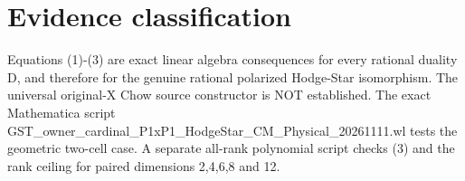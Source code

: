 \documentclass[11pt]{article}
\begin{document}
\section{Evidence classification}
Equations (1)-(3) are exact linear algebra
consequences for every rational duality D,
and therefore for the genuine rational
polarized Hodge-Star isomorphism.
The universal original-X Chow source
constructor is NOT established.
The exact Mathematica script
GST_owner_cardinal_P1xP1_HodgeStar_CM_Physical_20261111.wl
tests the geometric two-cell case.
A separate all-rank polynomial script
checks (3) and the rank ceiling for
paired dimensions 2,4,6,8 and 12.
\end{document}
